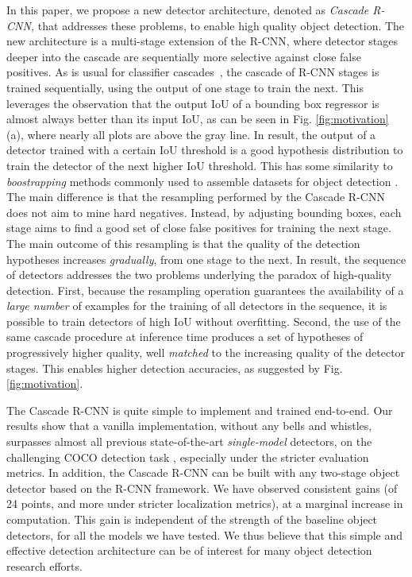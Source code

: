 \documentclass[10pt,journal,compsoc]{IEEEtran}
\begin{document}
In this paper, we propose a new detector architecture, denoted
as {\it Cascade R-CNN,\/} that addresses these problems, to enable high quality
object detection. The new architecture is a multi-stage extension of the
R-CNN, where detector stages deeper into the cascade are sequentially more
selective against close false positives. As is usual for classifier
cascades~\cite{DBLP:journals/ijcv/ViolaJ04,DBLP:journals/pami/SaberianV12}, the cascade of R-CNN stages is trained
sequentially, using the output of one stage to train the next. This
leverages the observation that the output IoU of a bounding box
regressor is almost always better than its input IoU, as can be
seen in Fig. \ref{fig:motivation} (a), where nearly all plots are above
the gray line. In result, the output of a detector trained with a certain
IoU threshold is a good hypothesis distribution to train the detector of the
next higher IoU threshold. This has some similarity to {\it boostrapping\/}
methods commonly used to assemble datasets for object detection \cite{DBLP:journals/ijcv/ViolaJ04,DBLP:journals/pami/FelzenszwalbGMR10}. The main difference is that the
resampling performed by the Cascade R-CNN does not aim to mine hard negatives.
Instead, by adjusting bounding boxes, each stage aims to find a good set of
close false positives for training the next stage. The main outcome of
this resampling is that the quality of the detection hypotheses increases
{\it gradually\/}, from one stage to the next. In result, the sequence
of detectors addresses the two problems underlying
the paradox of high-quality detection. First, because the resampling
operation guarantees the availability of a {\it large number\/} of examples for
the training of all detectors in the sequence, it is possible
to train detectors of high IoU without overfitting. Second,
the use of the same cascade procedure at inference time produces a set of
hypotheses of progressively higher quality, well {\it matched\/} to the
increasing quality of the detector stages. This enables
higher detection accuracies, as suggested by Fig. \ref{fig:motivation}.

The Cascade R-CNN is quite simple to implement and trained end-to-end.
Our results show that a vanilla implementation, without any bells and whistles,
surpasses almost all previous state-of-the-art \emph{single-model} detectors, on the challenging COCO detection
task \cite{DBLP:conf/eccv/LinMBHPRDZ14}, especially under the stricter
evaluation metrics. In addition, the Cascade R-CNN can be built with any
two-stage object detector based on the R-CNN framework. We have
observed consistent gains (of 24 points, and more under stricter localization metrics), at a marginal increase in
computation. This gain is independent of the strength of the baseline object
detectors, for all the models we have tested. We thus believe that this simple and effective detection
architecture can be of interest for many object detection research efforts.
\end{document}
